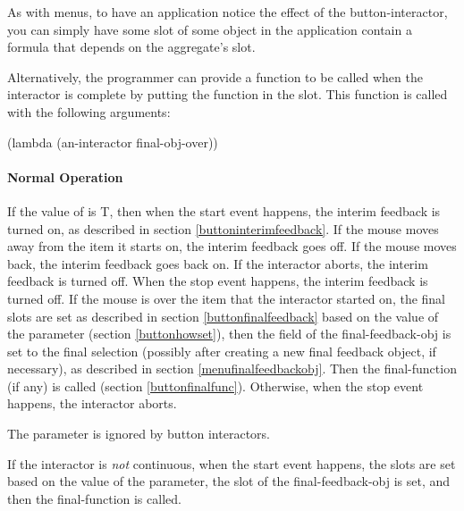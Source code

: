 As with menus, to have an application notice the effect of the
button-interactor, you can
simply have some slot of some object in the application contain a formula
that depends on the aggregate's  slot.

Alternatively, the programmer can provide a function to be called when the
interactor is complete by putting the function in the 
slot.  This function is called with the following arguments:
\begin{programexample}
(lambda (an-interactor final-obj-over))
\end{programexample}

\paragraph{Normal Operation}

If the value of  is T,
then when the start event happens, the interim feedback is turned on, as
described in section \ref{buttoninterimfeedback}.  If the mouse moves away
from the item it starts on, the interim feedback goes off.  If the mouse
moves back, the interim feedback goes back on.  If the interactor
aborts, the interim feedback is turned off.  When the stop event happens,
the interim feedback is turned off.
If the mouse is over the item that the interactor started on, the
final  slots are set
as described in section \ref{buttonfinalfeedback} based on the value of the
 parameter (section \ref{buttonhowset}), then the 
field of the final-feedback-obj is set to the final selection (possibly
after creating a new final feedback object, if necessary), as described in
section \ref{menufinalfeedbackobj}.  Then the final-function
(if any) is called (section \ref{buttonfinalfunc}).  Otherwise, when the
stop event happens, the interactor aborts.

The  parameter is ignored by button interactors.

If the interactor is {\it not} continuous, when the start event happens, the
 slots are set based on the value of the  parameter,
the  slot of the final-feedback-obj is set, and then the
final-function is called.

